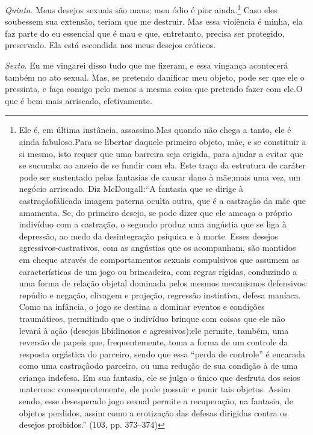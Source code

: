 \textit{Quinto.} Meus desejos sexuais são maus; meu ódio é pior
ainda.\footnote{ Ele é, em última instância, assassino.\idxagrespais[|nn] Mas quando não
chega a tanto, ele é ainda fabuloso.\idxperigohos[|nn] Para se libertar daquele primeiro
objeto, mãe, e se constituir a si mesmo, isto requer que uma barreira
seja erigida, para ajudar a evitar que se sucumba ao anseio de se
fundir com ela. Este traço da estrutura de caráter pode ser sustentado
pelas fantasias de causar dano à mãe;\idxmaeshosr[|nn] mais uma vez, um negócio
arriscado. Diz McDougall:\idxmcdoug[|nn] ``A fantasia que se dirige à
castração\idxcastr[|nn] fálica\idxrelpccast[|nn] da imagem paterna oculta outra, que é a castração da
mãe que amamenta. Se, do primeiro desejo, se pode dizer que ele ameaça
o próprio indivíduo com a castração, o segundo produz uma angústia que
se liga à depressão, ao medo da desintegração psíquica e à morte.
Esses desejos agressivos-castrativos, com as angústias que os
acompanham, são mantidos em cheque através de comportamentos sexuais
compulsivos que assumem as características de um jogo ou brincadeira,
com regras rígidas, conduzindo a uma forma de relação objetal dominada
pelos mesmos mecanismos defensivos: repúdio e negação, clivagem e
projeção, regressão instintiva, defesa maníaca. Como na
infância, o jogo se destina a dominar eventos e condições traumáticos,
permitindo que o indivíduo brinque com coisas que ele não levará à ação
(desejos libidinosos e agressivos);\idxagrespais[|nn] ele permite, também, uma reversão
de papeis que, frequentemente, toma a forma de um controle da resposta
orgástica do parceiro, sendo que essa ``perda de
controle'' é encarada como uma castração\idxcastr[|nn] do parceiro, ou
uma redução de sua condição à de uma criança indefesa. Em sua fantasia,
ele se julga o único que desfruta dos seios maternos: consequentemente,
ele pode possuir e punir tais objetos. Assim sendo, esse desesperado
jogo sexual permite a recuperação, na fantasia, de objetos perdidos,
assim como a erotização das defesas dirigidas contra os desejos
proibidos.'' (103, pp. 373--374)} Caso eles soubessem sua
extensão, teriam que me destruir. Mas essa violência é minha, ela faz
parte do eu essencial que é mau e que, entretanto, precisa ser
protegido, preservado. Ela está escondida nos meus desejos eróticos.

\textit{Sexto}. Eu me vingarei\idxvinga{} disso tudo que me fizeram, e essa
vingança acontecerá também no ato sexual.\idxperigohos{} Mas, se pretendo danificar
meu objeto, pode ser que ele o pressinta, e faça comigo pelo menos a
mesma coisa que pretendo fazer com ele.\idxfanta[|)] O que é bem mais arriscado,
efetivamente.

